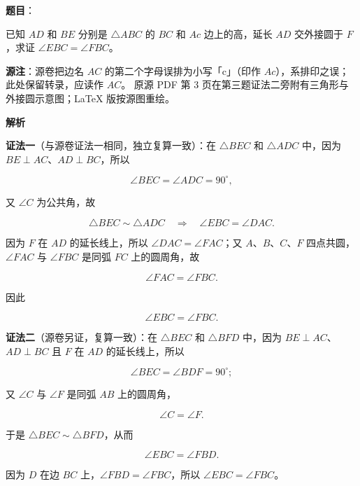 \begin{answer}

\textbf{题目}：

已知 $AD$ 和 $BE$ 分别是 $\triangle ABC$ 的 $BC$ 和 $Ac$ 边上的高，延长 $AD$ 交外接圆于 $F$，求证 $\angle EBC=\angle FBC$。

\begin{gktip}
\textbf{源注}：源卷把边名 $AC$ 的第二个字母误排为小写「c」（印作 $Ac$），系排印之误；此处保留转录，应读作 $AC$。
原源 PDF 第 3 页在第三题证法二旁附有三角形与外接圆示意图；LaTeX 版按源图重绘。
\end{gktip}
\nopagebreak[4]
\begin{center}\end{center}
\nopagebreak[4]
\textbf{解析}
\nopagebreak[4]
\begin{center}\end{center}
\nopagebreak[4]
\textbf{证法一}（与源卷证法一相同，独立复算一致）：在 $\triangle BEC$ 和 $\triangle ADC$ 中，因为 $BE\perp AC$、$AD\perp BC$，所以

\nopagebreak[4]
\[
\angle BEC=\angle ADC=90^\circ,
\]

又 $\angle C$ 为公共角，故

\nopagebreak[4]
\[
\triangle BEC\sim\triangle ADC
\quad\Longrightarrow\quad
\angle EBC=\angle DAC.
\]

因为 $F$ 在 $AD$ 的延长线上，所以 $\angle DAC=\angle FAC$；又 $A\text{、}B\text{、}C\text{、}F$ 四点共圆，$\angle FAC$ 与 $\angle FBC$ 是同弧 $FC$ 上的圆周角，故

\nopagebreak[4]
\[
\angle FAC=\angle FBC.
\]

因此

\nopagebreak[4]
\[
\angle EBC=\angle FBC.
\]

\textbf{证法二}（源卷另证，复算一致）：在 $\triangle BEC$ 和 $\triangle BFD$ 中，因为 $BE\perp AC$、$AD\perp BC$ 且 $F$ 在 $AD$ 的延长线上，所以

\nopagebreak[4]
\[
\angle BEC=\angle BDF=90^\circ;
\]

又 $\angle C$ 与 $\angle F$ 是同弧 $AB$ 上的圆周角，

\nopagebreak[4]
\[
\angle C=\angle F.
\]

于是 $\triangle BEC\sim\triangle BFD$，从而

\nopagebreak[4]
\[
\angle EBC=\angle FBD.
\]

因为 $D$ 在边 $BC$ 上，$\angle FBD=\angle FBC$，所以 $\angle EBC=\angle FBC$。


\end{answer}
